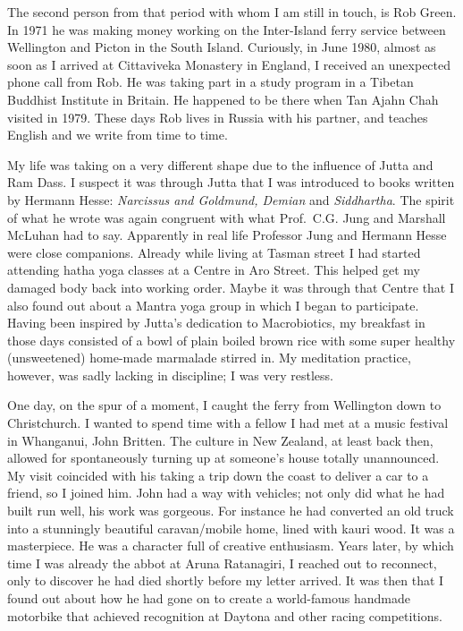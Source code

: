 The second person from that period with whom I am still in touch, is Rob
Green. In 1971 he was making money working on the Inter-Island ferry
service between Wellington and Picton in the South Island. Curiously, in
June 1980, almost as soon as I arrived at Cittaviveka Monastery in
England, I received an unexpected phone call from Rob. He was taking
part in a study program in a Tibetan Buddhist Institute in Britain. He
happened to be there when Tan Ajahn Chah visited in 1979. These days Rob
lives in Russia with his partner, and teaches English and we write from
time to time.

My life was taking on a very different shape due to the influence of
Jutta and Ram Dass. I suspect it was through Jutta that I was introduced
to books written by Hermann Hesse: \emph{Narcissus and Goldmund, Demian}
and \emph{Siddhartha}. The spirit of what he wrote was again congruent
with what Prof.~C.G. Jung and Marshall McLuhan had to say. Apparently in
real life Professor Jung and Hermann Hesse were close companions.
Already while living at Tasman street I had started attending hatha yoga
classes at a Centre in Aro Street. This helped get my damaged body back
into working order. Maybe it was through that Centre that I also found
out about a Mantra yoga group in which I began to participate. Having
been inspired by Jutta's dedication to Macrobiotics, my breakfast in
those days consisted of a bowl of plain boiled brown rice with some
super healthy (unsweetened) home-made marmalade stirred in. My
meditation practice, however, was sadly lacking in discipline; I was
very restless.

One day, on the spur of a moment, I caught the ferry from Wellington
down to Christchurch. I wanted to spend time with a fellow I had met at
a music festival in Whanganui, John Britten\cite{britten}.
The culture in New Zealand, at least back
then, allowed for spontaneously turning up at someone's house totally
unannounced. My visit coincided with his taking a trip down the coast to
deliver a car to a friend, so I joined him. John had a way with
vehicles; not only did what he had built run well, his work was
gorgeous. For instance he had converted an old truck into a stunningly
beautiful caravan/mobile home, lined with kauri wood. It was a
masterpiece. He was a character full of creative enthusiasm. Years
later, by which time I was already the abbot at Aruna Ratanagiri, I
reached out to reconnect, only to discover he had died shortly before my
letter arrived. It was then that I found out about how he had gone on to
create a world-famous handmade motorbike that achieved recognition at
Daytona\cite{daytona} and other racing competitions.

